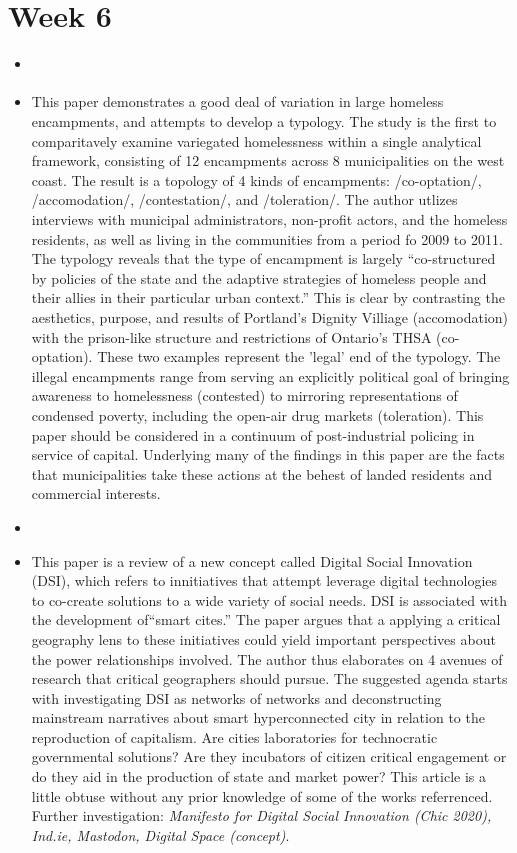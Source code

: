 \documentclass{article}
\begin{document}
\section{Week 6}
\begin{itemize}
\item \cite{herring2014NewLogics}
\item This paper demonstrates a good deal of variation in large homeless encampments, and attempts to develop a typology. The study is the first to comparitavely examine variegated homelessness within a single analytical framework, consisting of 12 encampments across 8 municipalities on the west coast. The result is a topology of 4 kinds of encampments: /co-optation/, /accomodation/, /contestation/, and /toleration/. The author utlizes interviews with municipal administrators, non-profit actors, and the homeless residents, as well as living in the communities from a period fo 2009 to 2011. The typology reveals that the type of encampment is largely ``co-structured by policies of the state and the adaptive strategies of homeless people and their allies in their particular urban context.'' This is clear by contrasting the aesthetics, purpose, and results of Portland's Dignity Villiage (accomodation) with the prison-like structure and restrictions of Ontario's THSA (co-optation). These two examples represent the 'legal' end of the typology. The illegal encampments range from serving an explicitly political goal of bringing awareness to homelessness (contested) to mirroring representations of condensed poverty, including the open-air drug markets (toleration). This paper should be considered in a continuum of post-industrial policing in service of capital. Underlying many of the findings in this paper are the facts that municipalities take these actions at the behest of landed residents and commercial interests.

\item \cite{certoma2020DigitalSocial}
\item This paper is a review of a new concept called Digital Social Innovation (DSI), which refers to innitiatives that attempt leverage digital technologies to co-create solutions to a wide variety of social needs. DSI is associated with the development of``smart cites.'' The paper argues that a applying a critical geography lens to these initiatives could yield important perspectives about the power relationships involved. The author thus elaborates on 4 avenues of research that critical geographers should pursue. The suggested agenda starts with investigating DSI as networks of networks and deconstructing mainstream narratives about smart hyperconnected city in relation to the reproduction of capitalism. Are cities laboratories for technocratic governmental solutions? Are they incubators of citizen critical engagement or do they aid in the production of state and market power? This article is a little obtuse without any prior knowledge of some of the works referrenced. Further investigation: \emph{Manifesto for Digital Social Innovation (Chic 2020), Ind.ie, Mastodon, Digital Space (concept)}.


\end{itemize}
\end{document}
